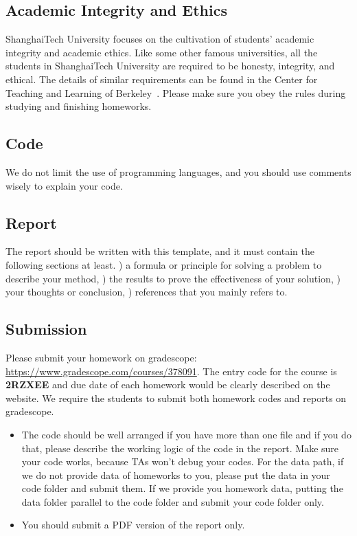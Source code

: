 \documentclass[10pt,twocolumn,letterpaper]{article}
\begin{document}
\subsection{Academic Integrity and Ethics}
 ShanghaiTech University focuses on the cultivation of students' academic integrity and academic ethics.  Like some other famous universities, all the students in ShanghaiTech University are required to be honesty, integrity, and ethical. The details of similar requirements can be found in the Center for Teaching and Learning of Berkeley~\cite{rules}. Please make sure you obey the rules during studying and finishing homeworks.
 
 \subsection{Code}
 We do not limit the use of programming languages, and you should use comments wisely to explain your code.
 
 \subsection{Report}
 The report should be written with this template, and it must contain the following sections at least. ) a formula or principle for solving a problem to describe your method, ) the results to prove the effectiveness of your solution, ) your thoughts or conclusion, ) references that you mainly refers to.
 
\subsection{Submission}
Please submit your homework on gradescope: \url{https://www.gradescope.com/courses/378091}. The entry code for the course is \textbf{2RZXEE} and due date of each homework would be clearly described on the website. We require the students to submit both homework codes and reports on gradescope.
 \begin{itemize}
\item The code should be well arranged if you have more than one file and if you do that, please describe the working logic of the code in the report. Make sure your code works, because TAs won't debug your codes. For the data path, if we do not provide data of homeworks to you, please put the data in your code folder and submit them. If we provide you homework data, putting the data folder parallel to the code folder and submit your code folder only. 
 \end{itemize}
\begin{itemize}
\item You should submit a PDF version of the report only.
\end{itemize}
\end{document}
